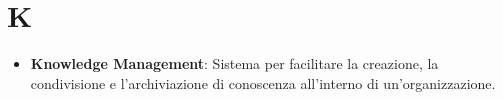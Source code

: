 \section{K}
\begin{itemize}
    \item \textbf{Knowledge Management}: Sistema per facilitare la creazione, la condivisione e l'archiviazione di conoscenza all'interno di un'organizzazione.
\end{itemize}
